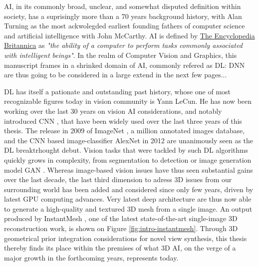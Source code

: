 \ac{AI}, in its commonly broad, unclear, and somewhat disputed definition within society, has a suprisingly more than a 70 years background history, with Alan Turning as the most ackwolegded earliest founding fathers of computer science \citep{turing1950computing} and artificial intelligence with John McCarthy. \ac{AI} is defined by \href{https://www.britannica.com/technology/artificial-intelligence}{The Encyclopedia Britannica} as \textit{"the ability of a computer to perform tasks commonly associated with intelligent beings"}. In the realm of Computer Vision and Graphics, this manuscript frames in a shrinked domain of \ac{AI}, commonly refered as \ac{DL}: \ac{DNN} are thus going to be considered in a large extend in the next few pages... 

\ac{DL} has itself a pationate and outstanding past history, whose one of most recognizable figures today in vision community is Yann LeCun. He has now been working over the last 30 years on vision \ac{AI} considerations, and notably introduced \ac{CNN} \citep{lecun1998gradient}, that have been widely used over the last three years of this thesis. The release in 2009 of ImageNet \citep{deng2009imagenet}, a million annotated images database, and the \ac{CNN} based image-classifier AlexNet \citep{krizhevsky2012imagenet} in 2012 are unanimously seen as the \ac{DL} breaktrhought debut. Vision tasks that were tackled by such \ac{DL} algorithms quickly grows in complexity, from segmentation \citep{long2015fully} to detection \citep{girshick2015fast} or image generation model \ac{GAN} \citep{goodfellow2014generative}. Whereas image-based vision issues have thus seen substantial gains over the last decade, the last third dimension to adress 3D issues from our surrounding world has been added and considered since only few years, driven by latest \ac{GPU} computing advances. Very latest deep architecture are thus now able to generate a high-quality and textured 3D mesh from a single image. An output produced by InstantMesh \citep{xu2024instantmesh}, one of the latest state-of-the-art single-image 3D reconstruction work, is shown on Figure \ref{fig:intro-instantmesh}. Through 3D geometrical prior integration considerations for novel view synthesis, this thesis thereby finds its place within the premises of what 3D AI, on the verge of a major growth in the forthcoming years, represents today.  


